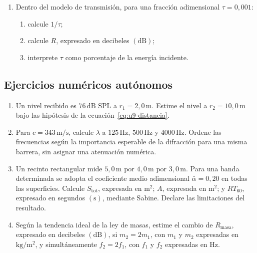 \begin{enumerate}[label=\textbf{G\arabic*.},leftmargin=*]
    \item Dentro del modelo de transmisión, para una fracción adimensional
    \(\tau=0{,}001\):
    \begin{enumerate}
        \item calcule \(1/\tau\);
        \item calcule \(R\), expresado en decibeles \((\text{dB})\);
        \item interprete \(\tau\) como porcentaje de la energía incidente.
    \end{enumerate}
\end{enumerate}

\subsection*{Ejercicios numéricos autónomos}

\begin{enumerate}[label=\textbf{A\arabic*.},leftmargin=*]
    \item Un nivel recibido es \(76\,\text{dB SPL}\) a
    \(r_1=2{,}0\,\text{m}\). Estime el nivel a \(r_2=10{,}0\,\text{m}\) bajo
    las hipótesis de la ecuación~\eqref{eq:u9-distancia}.

    \item Para \(c=343\,\text{m}/\text{s}\), calcule \(\lambda\) a
    \(125\,\text{Hz}\), \(500\,\text{Hz}\) y \(4000\,\text{Hz}\). Ordene las
    frecuencias según la importancia esperable de la difracción para una misma
    barrera, sin asignar una atenuación numérica.

    \item Un recinto rectangular mide \(5{,}0\,\text{m}\) por
    \(4{,}0\,\text{m}\) por \(3{,}0\,\text{m}\). Para una banda determinada se
    adopta el coeficiente medio adimensional
    \(\bar{\alpha}=0{,}20\) en todas las superficies. Calcule
    \(S_\mathrm{tot}\), expresada en \(\text{m}^2\); \(A\), expresada en
    \(\text{m}^2\); y \(RT_{60}\), expresado en segundos \((\text{s})\),
    mediante Sabine. Declare las limitaciones del resultado.

    \item Según la tendencia ideal de la ley de masas, estime el cambio de
    \(R_\mathrm{masa}\), expresado en decibeles \((\text{dB})\), si
    \(m_2=2m_1\), con \(m_1\) y \(m_2\) expresadas en
    \(\text{kg}/\text{m}^2\), y simultáneamente \(f_2=2f_1\), con \(f_1\) y
    \(f_2\) expresadas en \(\text{Hz}\).
\end{enumerate}

